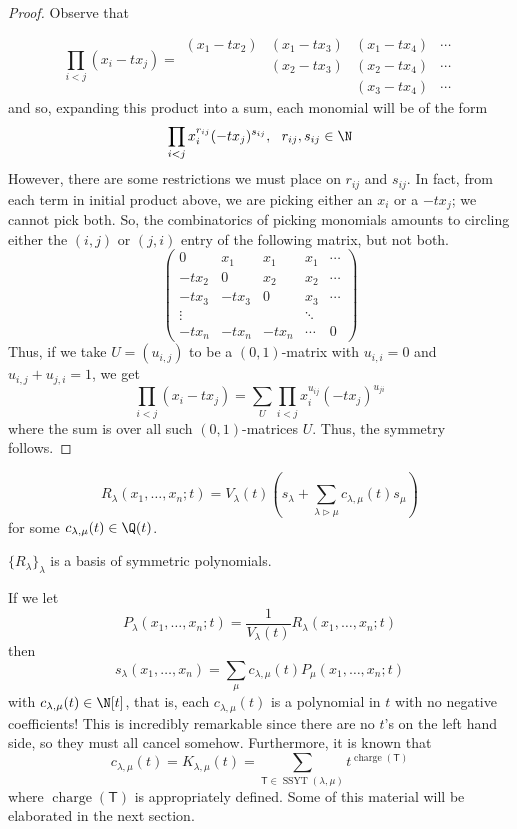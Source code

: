 \documentclass[11pt,leqno,oneside]{amsart}
\numberwithin{thm}{section}
\newcommand{\T}{\mathsf{T}} %
\newcommand{\charge}{\operatorname{charge}}
\newcommand{\SSYT}{\operatorname{SSYT}} %
\newcommand{\strictlydominates}{\rhd}
\begin{document}
\begin{proof}
  Observe that \[
    \prod_{i < j}(x_i-tx_j) =
    \begin{array}{cccc}
      &&&\\
      &&&\\
      (x_1-tx_2)&(x_1-tx_3)&(x_1-tx_4)&\cdots\\
                &(x_2-tx_3)&(x_2-tx_4)&\cdots\\
                &          &(x_3-tx_4)&\cdots
    \end{array}
  \]
  and so, expanding this product into a sum, each monomial will be of
  the form \[ 
    \prod_{i < j} x_i^{r_{ij}} (-tx_j)^{s_{ij}}, \ \ r_{ij},s_{ij} \in \N
  \]
  However, there are some restrictions we must place on \(r_{ij}\) and
  \(s_{ij}\). In fact, from each term in initial product above, we are
  picking either an \(x_i\) or a \(-tx_j\); we cannot pick both. So,
  the combinatorics of picking monomials amounts to circling either
  the \((i,j)\) or \((j,i)\) entry of the following matrix, but not
  both. \[
    \left(
      \begin{array}{ccccc}
        0&x_1&x_1&x_1&\cdots\\
        -tx_2&0&x_2&x_2&\cdots\\
        -tx_3&-tx_3&0&x_3&\cdots\\
        \vdots&&&\ddots&\\
        -tx_n&-tx_n&-tx_n&\cdots&0
      \end{array}
\right)
  \]
  Thus, if we take \(U = (u_{i,j})\) to be a \((0,1)\)-matrix with
  \(u_{i,i} = 0\) and \(u_{i,j}+u_{j,i} = 1\), we get \[
    \prod_{i < j} (x_i-tx_j) = \sum_{U} \prod_{i < j} x_i^{u_{ij}}(-t
    x_j)^{u_{ji}} 
  \]
  where the sum is over all such \((0,1)\)-matrices \(U\). Thus, the
  symmetry follows. 
\end{proof}
\begin{prop}
  \[
    R_\lambda(x_1, \ldots, x_n;t) = V_{\lambda}(t) \left( s_\lambda +
      \sum_{\lambda \strictlydominates \mu} c_{\lambda,\mu}(t) s_\mu
    \right) 
  \]
  for some \(c_{\lambda,\mu}(t) \in \Q(t)\).
\end{prop}
\begin{cor}
  \(\{R_\lambda\}_{\lambda}\) is a basis of symmetric polynomials.
\end{cor}
\begin{rmk}\label{s-in-terms-of-P}
  If we let \[
    P_\lambda(x_1, \ldots, x_n; t) = \frac{1}{V_\lambda(t)}
    R_\lambda(x_1, \ldots, x_n;t)
  \]
  then \[
    s_\lambda(x_1, \ldots, x_n) = \sum_{\mu} c_{\lambda,\mu}(t)
    P_\mu(x_1, \ldots, x_n;t) 
  \]
  with \(c_{\lambda,\mu}(t) \in \N[t]\), that is, each
  \(c_{\lambda,\mu}(t)\) is a polynomial in \(t\) with no negative
  coefficients! This is incredibly remarkable since there are no
  \(t\)'s on the left hand side, so they must all cancel
  somehow. Furthermore, it is known that \[
    c_{\lambda,\mu}(t) = K_{\lambda,\mu}(t) = \sum_{\T \in
      \SSYT(\lambda,\mu)} t^{\charge(\T)}
  \]
  where \(\charge(\T)\) is appropriately defined. Some of this
  material will be elaborated in the next section.
\end{rmk}
\end{document}

